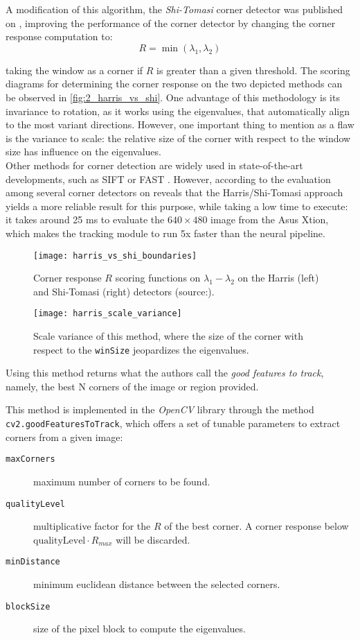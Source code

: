A modification of this algorithm, the \textit{Shi-Tomasi} corner detector was published on \cite{shi_tomasi}, improving the performance of the corner detector by changing the corner response computation to:
$$
R = \min(\lambda_1, \lambda_2)
$$

taking the window as a corner if $R$ is greater than a given threshold. The scoring diagrams for determining the corner response on the two depicted methods can be observed in \autoref{fig:2_harris_vs_shi}. One advantage of this methodology is its invariance to rotation, as it works using the eigenvalues, that automatically align to the most variant directions. However, one important thing to mention as a flaw is the variance to scale: the relative size of the corner with respect to the window size has influence on the eigenvalues.\\

Other methods for corner detection are widely used in state-of-the-art developments, such as SIFT \cite{sift} or FAST \cite{fast}. However, according to the evaluation among several corner detectors on \cite{corner_detectors} reveals that the Harris/Shi-Tomasi approach yields a more reliable result for this purpose, while taking a low time to execute: it takes around 25 ms to evaluate the $640\times 480$ image from the Asus Xtion, which makes the tracking module to run 5x faster than the neural pipeline.

\begin{figure}[h]
	\centering
	\texttt{[image: harris\_vs\_shi\_boundaries]}
	\caption{Corner response $R$ scoring functions on $\lambda_1-\lambda_2$ on the Harris (left) and Shi-Tomasi (right) detectors (source:\cite{nanonets_optical_flow}).}
	\label{fig:2_harris_vs_shi}
\end{figure}

\begin{figure}[h]
	\centering
	\texttt{[image: harris\_scale\_variance]}
	\caption{Scale variance of this method, where the size of the corner with respect to the \texttt{winSize} jeopardizes the eigenvalues.}
	\label{fig:2_harris_scale}
\end{figure}

Using this method returns what the authors call the \textit{good features to track}, namely, the best N corners of the image or region provided.

 This method is implemented in the \textit{OpenCV} library through the method \texttt{cv2.goodFeaturesToTrack}, which offers a set of tunable parameters to extract corners from a given image:
 \begin{description}
 	\item[\texttt{maxCorners}] maximum number of corners to be found.
 	\item[\texttt{qualityLevel}] multiplicative factor for the $R$ of the best corner. A corner response below $\text{qualityLevel}\cdot R_{max}$ will be discarded.
 	\item[\texttt{minDistance}] minimum euclidean distance between the selected corners.
 	\item[\texttt{blockSize}] size of the pixel block to compute the eigenvalues.
 \end{description}

